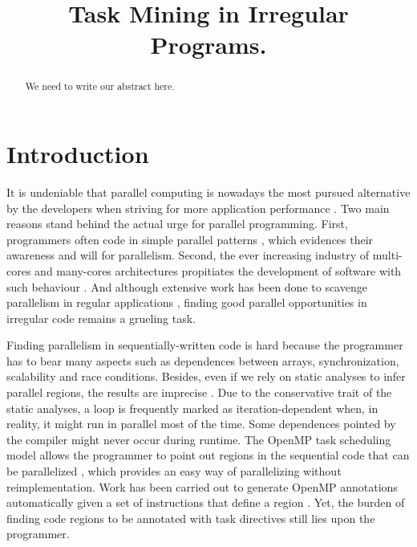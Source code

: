 \documentclass[pageno]{jpaper}
\begin{document}
\title{Task Mining in Irregular Programs.}

\date{}
\maketitle

\thispagestyle{empty}

\begin{abstract}
We need to write our abstract here.
\end{abstract}

\section{Introduction}
\label{sec:intro}


It is undeniable that parallel computing is nowadays the most pursued alternative by the developers 
when striving for more application performance \cite{hwu2014ahead}. Two main reasons stand behind 
the actual urge for parallel programming. First, programmers often code in simple parallel patterns 
\cite{pinto2015large}, which evidences their awareness and will for parallelism. Second, the ever 
increasing industry of multi-cores and many-cores architectures propitiates the development of software 
with such behaviour \cite{haugen2016performance, vandierendonck2013analysis}. And although extensive 
work has been done to scavenge parallelism in regular applications \cite{kulkarni2009much}, finding good 
parallel opportunities in irregular code remains a grueling task.

Finding parallelism in sequentially-written code is hard because the programmer has to bear many aspects 
such as dependences between arrays, synchronization, scalability and race conditions.
Besides, even if we rely on static analyses to infer parallel regions, the results are imprecise 
\cite{kulkarni2007optimistic}. Due to the conservative trait of the static analyses, a
loop is frequently marked as iteration-dependent when, in reality, it might run in parallel most of the time. 
Some dependences pointed by the compiler might never occur during runtime. 
The OpenMP task scheduling model allows the programmer to point out regions in the sequential code that 
can be parallelized \cite{openmp2009}, which provides an easy way of parallelizing without reimplementation. 
Work has been carried out to generate OpenMP annotations automatically given a set of instructions that define 
a region \cite{gleison2016, pingali2011tao, wanggenerating}. Yet, the burden of finding code regions to be 
annotated with task directives still lies upon the programmer.
\end{document}
